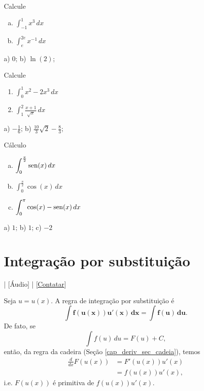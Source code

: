 \begin{exer}
  Calcule
  \begin{enumerate}[a)]
  \item $\displaystyle \int_{-1}^1 x^3\,dx$
  \item $\displaystyle \int_e^{2e} x^{-1}\,dx$
  \end{enumerate}
\end{exer}
\begin{resp}
  a) $0$; b) $\ln(2)$;
\end{resp}

\begin{exer}
  Calcule
  \begin{enumerate}
  \item $\displaystyle \int_0^1 x^2 - 2x^3\,dx$
  \item $\displaystyle \int_1^2 \frac{x+1}{\sqrt{x}}\,dx$
  \end{enumerate}
\end{exer}
\begin{resp}
  a) $\displaystyle -\frac{1}{6}$; b) $\displaystyle \frac{10}{3}\sqrt{2} - \frac{8}{3}$;
\end{resp}

\begin{exer}
  Cálculo
  \begin{enumerate}[a)]
  \item $\displaystyle \int_0^{\frac{\pi}{2}}\operatorname{sen}(x)\,dx$
  \item $\displaystyle \int_0^{\frac{\pi}{2}}\cos(x)\,dx$
  \item $\displaystyle \int_0^{\pi}\cos(x)-\operatorname{sen}(x)\,dx$
  \end{enumerate}
\end{exer}
\begin{resp}
  a) $1$; b) $1$; c) $-2$
\end{resp}

\section{Integração por substituição}\label{cap_int_sec_subs}

\begin{flushright}
  [Vídeo] | [Áudio] | \href{https://phkonzen.github.io/notas/contato.html}{[Contatar]}
\end{flushright}

Seja $u = u(x)$. A regra de integração por substituição é
\begin{equation}
  \pmb{\int f(u(x))u'(x)\,dx = \int f(u)\,du}.
\end{equation}
De fato, se
\begin{equation}
  \int f(u)\,du = F(u) + C,
\end{equation}
então, da regra da cadeira (Seção \ref{cap_deriv_sec_cadeia}), temos
\begin{align}
  \frac{d}{dx}F(u(x)) &= F'(u(x))u'(x) \\
                      &= f(u(x))u'(x),
\end{align}
i.e. $F(u(x))$ é primitiva de $f(u(x))u'(x)$.

